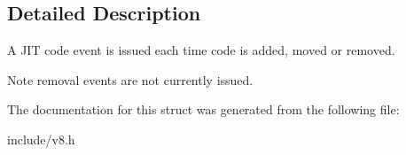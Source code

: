 \subsection{Detailed Description}
A J\+IT code event is issued each time code is added, moved or removed.

\begin{DoxyNote}{Note}
removal events are not currently issued. 
\end{DoxyNote}


The documentation for this struct was generated from the following file\+:\begin{DoxyCompactItemize}
\item 
include/v8.\+h\end{DoxyCompactItemize}
